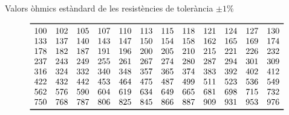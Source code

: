 \begin{table}[htb]
   \caption{Valors \`{o}hmics est\`{a}ndard de les resist\`{e}ncies de toler\`{a}ncia $\pm1\unit{\%}$}
   \[ \begin{array}{cccccccccccc}
   \toprule[1pt]
   100 & 102 & 105 & 107 & 110 & 113 & 115 & 118 & 121 & 124 & 127 & 130 \\
   133 & 137 & 140 & 143 & 147 & 150 & 154 & 158 & 162 & 165 & 169 & 174 \\
   178 & 182 & 187 & 191 & 196 & 200 & 205 & 210 & 215 & 221 & 226 & 232 \\
   237 & 243 & 249 & 255 & 261 & 267 & 274 & 280 & 287 & 294 & 301 & 309 \\
   316 & 324 & 332 & 340 & 348 & 357 & 365 & 374 & 383 & 392 & 402 & 412 \\
   422 & 432 & 442 & 453 & 464 & 475 & 487 & 499 & 511 & 523 & 536 & 549 \\
   562 & 576 & 590 & 604 & 619 & 634 & 649 & 665 & 681 & 698 & 715 & 732 \\
   750 & 768 & 787 & 806 & 825 & 845 & 866 & 887 & 909 & 931 & 953 & 976 \\
   \bottomrule[1pt]
   \end{array}   \]
\end{table}


